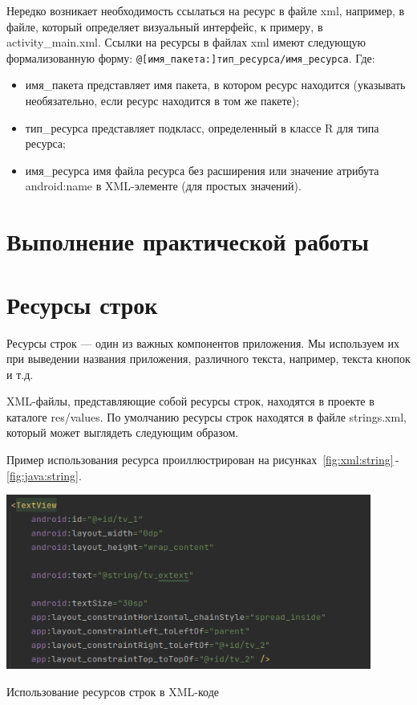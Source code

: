 Нередко возникает необходимость ссылаться на ресурс в файле xml,
например, в файле, который определяет визуальный интерфейс, к примеру, в
activity\_main.xml. Ссылки на ресурсы в файлах xml имеют следующую
формализованную форму: \verb|@[имя_пакета:]тип_ресурса/имя_ресурса|. Где:
\begin{itemize}
	\item имя\_пакета представляет имя пакета, в котором ресурс находится
		(указывать необязательно, если ресурс находится в том же пакете);
	\item тип\_ресурса представляет подкласс, определенный в классе R для
		типа ресурса;
	\item имя\_ресурса имя файла ресурса без расширения или значение
		атрибута android:name в XML-элементе (для простых значений).
\end{itemize}

\clearpage

\section*{\LARGE{Выполнение практической работы}}

\section{Ресурсы строк}
Ресурсы строк --- один из важных компонентов приложения. Мы используем
их при выведении названия приложения, различного текста, например, текста
кнопок и т.д.\par
XML-файлы, представляющие собой ресурсы строк, находятся в проекте в
каталоге res/values. По умолчанию ресурсы строк находятся в файле strings.xml,
который может выглядеть следующим образом.\par
Пример использования ресурса проиллюстрирован на
рисунках~\ref{fig:xml:string}\,-\,\ref{fig:java:string}.

\begin{image}
	\includegraphics[width=0.9\textwidth]{Screenshot from 2023-03-28 15-20-22}
	\caption{Использование ресурсов строк в XML-коде}
	\label{fig:xml:string}
\end{image}

